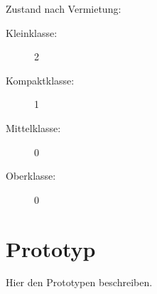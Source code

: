 Zustand nach Vermietung:
\begin{description}
	\item[Kleinklasse:] 2
	\item[Kompaktklasse:] 1
	\item[Mittelklasse:] 0
	\item[Oberklasse:] 0
\end{description}

\section{Prototyp}

Hier den Prototypen beschreiben.

%


